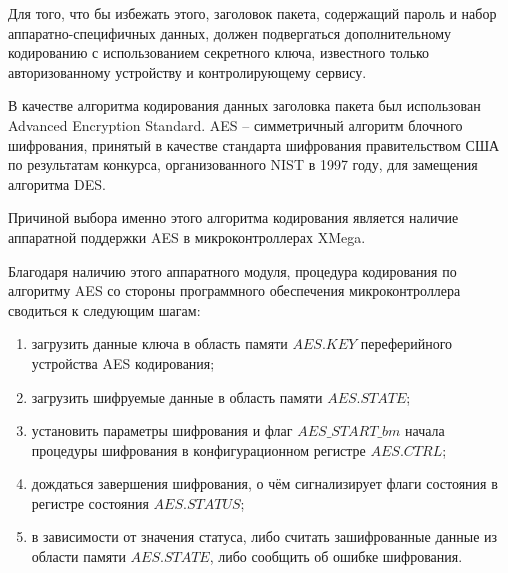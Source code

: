 Для того, что бы избежать этого, заголовок пакета, содержащий пароль
и набор аппаратно-специфичных данных, должен подвергаться дополнительному
кодированию с использованием секретного ключа, известного только
авторизованному устройству и контролирующему сервису.


В качестве алгоритма кодирования данных заголовка пакета был использован
Advanced Encryption Standard. AES -- симметричный алгоритм блочного
шифрования, принятый в качестве стандарта шифрования правительством США
по результатам конкурса, организованного NIST в 1997 году, для замещения
алгоритма DES.


Причиной выбора именно этого алгоритма кодирования является
наличие аппаратной поддержки AES в микроконтроллерах XMega.


Благодаря наличию этого аппаратного модуля, процедура кодирования
по алгоритму AES со стороны программного обеспечения микроконтроллера
сводиться к следующим шагам:
\begin{enumerate}
    \item{} загрузить данные ключа в область памяти $AES.KEY$
        переферийного устройства AES кодирования;
    \item{} загрузить шифруемые данные в область памяти $AES.STATE$;
    \item{} установить параметры шифрования и флаг $AES\_START\_bm$ начала
        процедуры шифрования в конфигурационном регистре $AES.CTRL$;
    \item{} дождаться завершения шифрования, о чём сигнализирует
        флаги состояния в регистре состояния $AES.STATUS$;
    \item{} в зависимости от значения статуса, либо считать зашифрованные
        данные из области памяти $AES.STATE$, либо сообщить об ошибке
        шифрования.
\end{enumerate}

